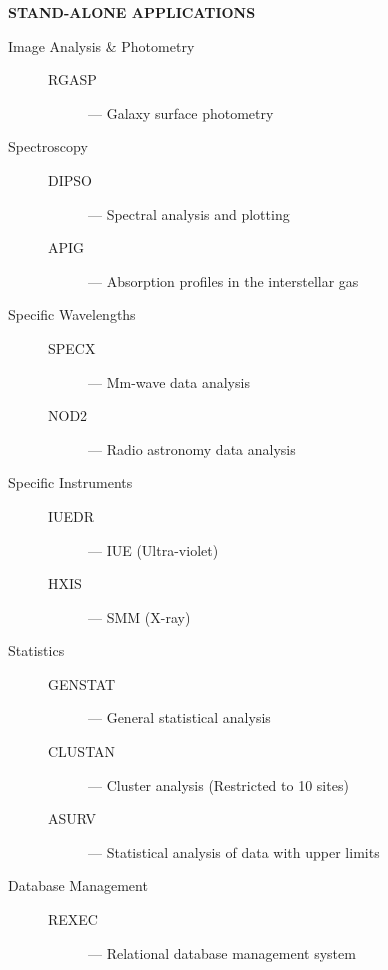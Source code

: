 \newpage

\begin{center}
{\bf\Large STAND-ALONE APPLICATIONS}
\end{center}

\begin{description}

\item [Image Analysis \& Photometry] \mbox{}
\begin{description}
\item [RGASP] --- Galaxy surface photometry
\end{description}

\item [Spectroscopy] \mbox{}
\begin{description}
\item [DIPSO] --- Spectral analysis and plotting
\item [APIG] --- Absorption profiles in the interstellar gas
\end{description}

\item [Specific Wavelengths] \mbox{}
\begin{description}
\item [SPECX] ---  Mm-wave data analysis
\item [NOD2] --- Radio astronomy data analysis
\end{description}

\item [Specific Instruments] \mbox{}
\begin{description}
\item [IUEDR] --- IUE (Ultra-violet)
\item [HXIS] --- SMM (X-ray)
\end{description}

\item [Statistics] \mbox{}
\begin{description}
\item [GENSTAT] --- General statistical analysis
\item [CLUSTAN] --- Cluster analysis (Restricted to 10 sites)
\item [ASURV] --- Statistical analysis of data with upper limits
\end{description}

\item [Database Management] \mbox{}
\begin{description}
\item [REXEC] --- Relational database management system
\end{description}

\end{description}

